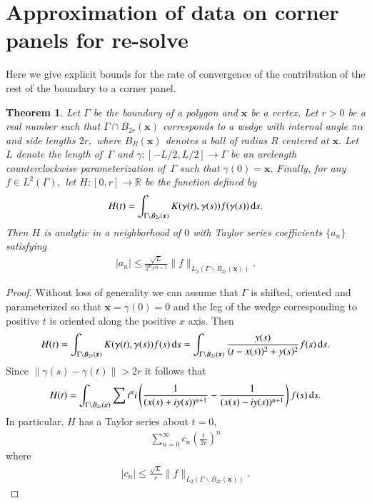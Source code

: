 \documentclass[12pt,times]{elsarticle}
\newcommand{\bx}{\boldsymbol{x}}
\newtheorem{theorem}[definition]{Theorem}
\begin{document}
\section{Approximation of data on corner panels for re-solve}
Here we give explicit bounds for the rate of convergence of the contribution of the rest of the boundary to a corner panel.
\begin{theorem}
Let $\Gamma$ be the boundary of a polygon and $\bx$ be a vertex. Let $r>0$ be a real number such that $\Gamma \cap B_{2r}(\bx)$ corresponds to a wedge with internal angle $\pi \alpha$ and side lengths $2r,$ where $B_R(\bx)$ denotes a ball of radius $R$ centered at $\bx.$ Let $L$ denote the length of\, $\Gamma$ and $\gamma: [-L/2,L/2]\to \Gamma$ be an arclength counterclockwise parameterization of\, $\Gamma$ such that $\gamma(0) = \bx.$ Finally, for any $f \in L^2(\Gamma),$ let $H:[0,r] \to \mathbb{R}$ be the function defined by
\begin{align}
H(t) = \int_{\Gamma\backslash B_{2r}(\bx)} K(\gamma(t),\gamma(s)) f(\gamma(s))\,{\rm d}s.
\end{align}
Then $H$ is analytic in a neighborhood of $0$ with Taylor series coefficients $\{ a_n\}$ satisfying
\begin{align}
|a_n| \le \frac{\sqrt{L}}{2^nr^{n+1}} \|f\|_{L_2(\Gamma \backslash B_{2r}(\bx))}.
\end{align}
\end{theorem}
\begin{proof}
Without loss of generality we can assume that $\Gamma$ is shifted, oriented and parameterized so that $\bx = \gamma(0)= 0$ and the leg of the wedge corresponding to positive $t$ is oriented along the positive $x$ axis. Then
\begin{align}
H(t) = \int_{\Gamma\backslash B_{2r}(\bx)} K(\gamma(t),\gamma(s)) f(s)\,{\rm d}s = \int_{\Gamma\backslash B_{2r}(\bx)} \frac{y(s)}{(t-x(s))^2+y(s)^2}f(s)\,{\rm d}s.
\end{align}
Since $\|\gamma(s)-\gamma(t)\| >2r$ it follows that
\begin{align}
H(t) =\int _{\Gamma\backslash B_{2r}(\bx)}\sum {t^n i}\left(\frac{1}{(x(s)+i y(s))^{n+1}}-\frac{1}{(x(s)-i y(s))^{n+1}} \right) f(s)\,{\rm d}s.
\end{align}
In particular, $H$ has a Taylor series about $t=0,$
\begin{align}
\sum_{n=0}^\infty c_n \left(\frac{t}{2r}\right)^n
\end{align}
where
\begin{align}
|c_n| \le  \frac{\sqrt{L}}{r} \|f\|_{L_2(\Gamma \backslash B_{2r}(\bx))}.
\end{align}
\end{proof}
\end{document}
